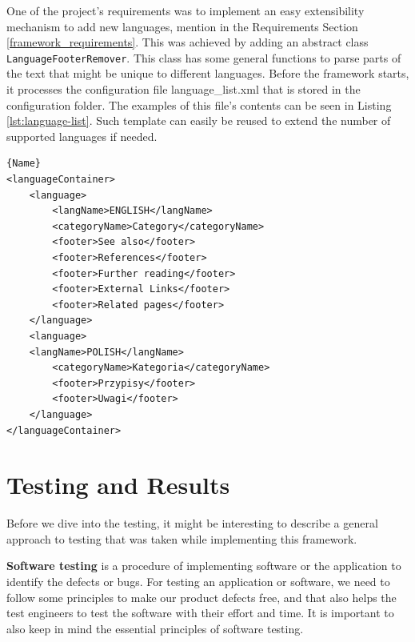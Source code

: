 \documentclass[thesis=M,english,hidelinks]{FITthesis}[2019/12/23]
\begin{document}
One of the project's requirements was to implement an easy extensibility mechanism to add new languages, mention in the Requirements Section \ref{framework_requirements}. This was achieved by adding an abstract class \lstinline{LanguageFooterRemover}. This class has some general functions to parse parts of the text that might be unique to different languages. Before the framework starts, it processes the configuration file language\_list.xml that is stored in the configuration folder. The examples of this file's contents can be seen in Listing \ref{lst:language-list}. Such template can easily be reused to extend the number of supported languages if needed.

\begin{lstlisting}[caption=Example of an language configuration file,frame=tlrb,  label = {lst:language-list}]{Name}
<languageContainer>
	<language>
		<langName>ENGLISH</langName>
		<categoryName>Category</categoryName>
		<footer>See also</footer>
		<footer>References</footer>
		<footer>Further reading</footer>
		<footer>External Links</footer>
		<footer>Related pages</footer>
	</language>
	<language>
	<langName>POLISH</langName>
		<categoryName>Kategoria</categoryName>
		<footer>Przypisy</footer>
		<footer>Uwagi</footer>
	</language>
</languageContainer>
\end{lstlisting}

\chapter{Testing and Results}

Before we dive into the testing, it might be interesting to describe a general approach to testing that was taken while implementing this framework.

\textbf{Software testing} is a procedure of implementing software or the application to identify the defects or bugs. For testing an application or software, we need to follow some principles to make our product defects free, and that also helps the test engineers to test the software with their effort and time. It is important to also keep in mind the essential principles of software testing.
\end{document}
